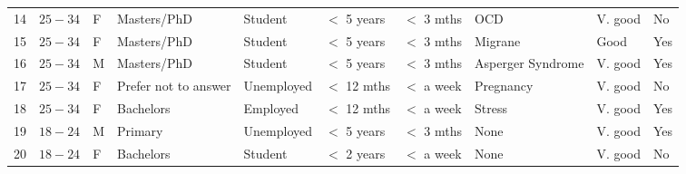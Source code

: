 \begin{table}[t]
\begin{tabular}{p{0.15cm} p{0.75cm} p{0.2cm} p{2cm} p{1.5cm} p{1.15cm} p{1.45cm} p{2cm} p{1.1cm} p{0.25cm}}
    14	&   $25-34$	& F    &   Masters/PhD	            &   Student	    &  $<$ 5 years     & $<$ 3 mths	    & OCD	                 & V. good	    & No     \\ 
    15	&   $25-34$	& F    &   Masters/PhD	            &   Student	    &  $<$ 5 years     & $<$ 3 mths	    & Migrane	             & Good	        & Yes    \\ \rowcolor[gray]{.95}
    16	&   $25-34$	& M    &   Masters/PhD	            &   Student	    &  $<$ 5 years     & $<$ 3 mths	    & Asperger Syndrome	     & V. good	    & Yes    \\ 
    17	&   $25-34$	& F    &   Prefer not to answer	    &   Unemployed	&  $<$ 12 mths     & $<$ a week	    & Pregnancy	             & V. good	    & No     \\ \rowcolor[gray]{.95}
    18	&   $25-34$	& F    &   Bachelors	            &   Employed	&  $<$ 12 mths     & $<$ a week	    & Stress	             & V. good	    & Yes    \\ 
    19	&   $18-24$	& M    &   Primary	                &   Unemployed	&  $<$ 5 years     & $<$ 3 mths	    & None	                 & V. good	    & Yes    \\ \rowcolor[gray]{.95}
    20	&   $18-24$	& F    &   Bachelors	            &   Student	    &  $<$ 2 years     & $<$ a week	    & None	                 & V. good	    & No     \\ 
        
    \bottomrule
    
    \end{tabular}
    \label{tab:demographics}
\end{table}


